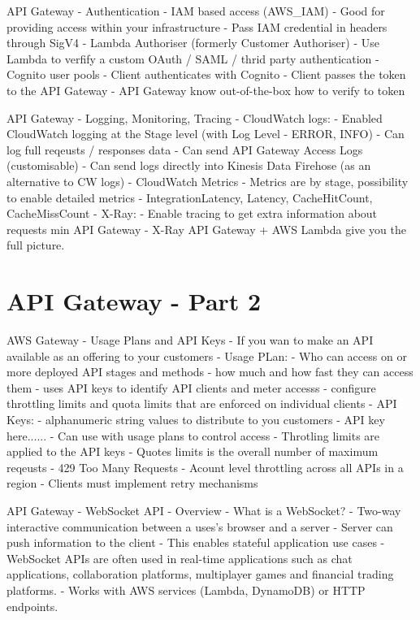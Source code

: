API Gateway - Authentication
- IAM based access (AWS_IAM)
- Good for providing access within your infrastructure
- Pass IAM credential in headers through SigV4
- Lambda Authoriser (formerly Customer Authoriser)
- Use Lambda to verfify a custom OAuth / SAML / thrid party authentication
- Cognito user pools
- Client authenticates with Cognito
- Client passes the token to the API Gateway
- API Gateway know out-of-the-box how to verify to token

API Gateway - Logging, Monitoring, Tracing
- CloudWatch logs:
- Enabled CloudWatch logging at the Stage level (with Log Level - ERROR, INFO)
- Can log full reqeusts / responses data
- Can send API Gateway Access Logs (customisable)
- Can send logs directly into Kinesis Data Firehose (as an alternative to CW logs)
- CloudWatch Metrics
- Metrics are by stage, possibility to enable detailed metrics
- IntegrationLatency, Latency, CacheHitCount, CacheMissCount
- X-Ray:
- Enable tracing to get extra information about requests min API Gateway
- X-Ray API Gateway + AWS Lambda give you the full picture.


\section{API Gateway - Part 2}
AWS Gateway - Usage Plans and API Keys
- If you wan to make an API available as an offering to your customers
- Usage PLan:
- Who can access on or more deployed API stages and methods
- how much and how fast they can access them
- uses API keys to identify API clients and meter accesss
- configure throttling limits and quota limits that are enforced on individual clients
- API Keys:
- alphanumeric string values to distribute to you customers
- API key here......
- Can use with usage plans to control access
- Throtling limits are applied to the API keys
- Quotes limits is the overall number of maximum reqeusts
- 429 Too Many Requests
- Acount level throttling across all APIs in a region
- Clients must implement retry mechanisms

API Gateway - WebSocket API - Overview
- What is a WebSocket?
- Two-way interactive communication between a uses's browser and a server
- Server can push information to the client
- This enables stateful application use cases
- WebSocket APIs are often used in real-time applications such as chat applications, collaboration platforms, multiplayer games and financial trading platforms.
- Works with AWS services (Lambda, DynamoDB) or HTTP endpoints.

